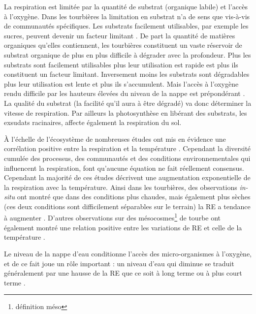 La respiration est limitée par la quantité de substrat (organique labile) et l'accès à l'oxygène.
Dans les tourbières la limitation en substrat n'a de sens que vis-à-vis de communautés spécifiques.
Les substrats facilement utilisables, par exemple les sucres, peuvent devenir un facteur limitant \citep{gornall2011}.
De part la quantité de matières organiques qu'elles contiennent, les tourbières constituent un vaste réservoir de substrat organique de plus en plus difficile à dégrader avec la profondeur.
Plus les substrats sont facilement utilisables plus leur utilisation est rapide est plus ils constituent un facteur limitant.
Inversement moins les substrats sont dégradables plus leur utilisation est lente et plus ils s'accumulent.
Mais l'accès à l'oxygène rendu difficile par les hauteurs élevées du niveau de la nappe est prépondérant \citep{blodau2002}.
La qualité du substrat (la facilité qu'il aura à être dégradé) va donc déterminer la vitesse de respiration.
Par ailleurs la photosynthèse en libérant des substrats, les exsudats racinaires, affecte également la respiration du sol.

À l'échelle de l'écosystème de nombreuses études ont mis en évidence une corrélation positive entre la respiration et la température \citep{singh1977,raich1992,luo2006}.
Cependant la diversité cumulée des processus, des communautés et des conditions environnementales qui influencent la respiration, font qu'aucune équation ne fait réellement consensus.
Cependant la majorité de ces études décrivent une augmentation exponentielle de la respiration avec la température.
Ainsi dans les tourbières, des observations \textit{in-situ} ont montré que dans des conditions plus chaudes, mais également plus sèches (ces deux conditions sont difficilement séparables sur le terrain) la RE a tendance à augmenter  \citep{aurela2007,cai2010,ward2013}.
D'autres observations sur des mésocosmes\footnote{définition méso} de tourbe ont également montré une relation positive entre les variations de RE et celle de la température \citep{updegraff2001,weedon2013}.

Le niveau de la nappe d'eau conditionne l'accès des micro-organismes à l'oxygène, et de ce fait joue un rôle important : un niveau d'eau qui diminue se traduit généralement par une hausse de la RE que ce soit à long terme \citep{strack2006,ballantyne2014} ou à plus court terme \citep{aerts1997}.

